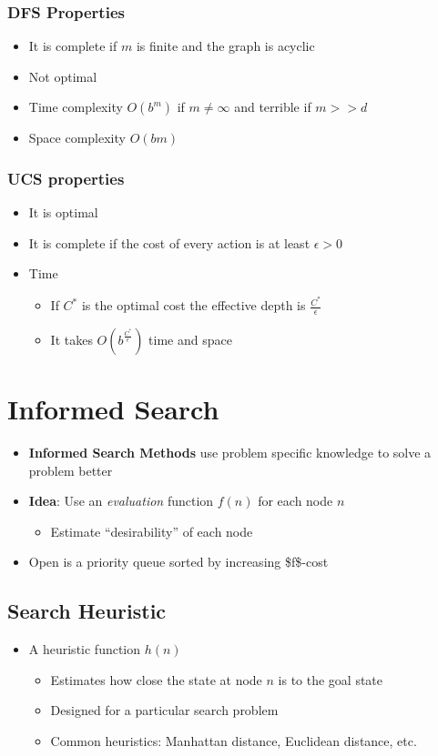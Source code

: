 \documentclass[11pt]{article}
\begin{document}
\subsubsection{DFS Properties}
\label{sec:org2fbf8a8}
\begin{itemize}
\item It is complete if \(m\) is finite and the graph is acyclic
\item Not optimal
\item Time complexity \(O(b^m)\) if \(m \ne \infty\) and terrible if \(m >> d\)
\item Space complexity \(O(bm)\)
\end{itemize}
\subsubsection{UCS properties}
\label{sec:org5fc0046}
\begin{itemize}
\item It is optimal
\item It is complete if the cost of every action is at least \(\epsilon > 0\)
\item Time
\begin{itemize}
\item If \(C^*\) is the optimal cost the effective depth is \(\frac{C^*}{\epsilon}\)
\item It takes \(O(b^{\frac{C^*}{\epsilon}})\) time and space
\end{itemize}
\end{itemize}
\section{Informed Search}
\label{sec:orgd4adeff}
\begin{itemize}
\item \textbf{Informed Search Methods} use problem specific knowledge to solve a problem better
\item \textbf{Idea}: Use an \emph{evaluation} function \(f(n)\) for each node \(n\)
\begin{itemize}
\item Estimate ``desirability'' of each node
\end{itemize}
\item Open is a priority queue sorted by increasing \$f\$-cost
\end{itemize}

\subsection{Search Heuristic}
\label{sec:orgca1dd3d}
\begin{itemize}
\item A heuristic function \(h(n)\)
\begin{itemize}
\item Estimates how close the state at node \(n\) is to the goal state
\item Designed for a particular search problem
\item Common heuristics: Manhattan distance, Euclidean distance, etc.
\end{itemize}
\end{itemize}
\end{document}
